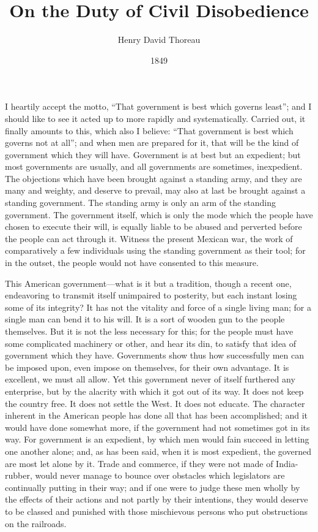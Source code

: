 \documentclass[letterpaper,12pt]{article}
\title{On the Duty of Civil Disobedience}
\author{Henry David Thoreau}
\date{1849}
\begin{document}
\maketitle

I heartily accept the motto, \enquote{That government is best which governs
    least}; and I should like to see it acted up to more rapidly and
systematically. Carried out, it finally amounts to this, which also I believe:
\enquote{That government is best which governs not at all}; and when men are
prepared for it, that will be the kind of government which they will have.
Government is at best but an expedient; but most governments are usually, and
all governments are sometimes, inexpedient. The objections which have been
brought against a standing army, and they are many and weighty, and deserve to
prevail, may also at last be brought against a standing government. The standing
army is only an arm of the standing government. The government itself, which is
only the mode which the people have chosen to execute their will, is equally
liable to be abused and perverted before the people can act through it. Witness
the present Mexican war, the work of comparatively a few individuals using the
standing government as their tool; for in the outset, the people would not have
consented to this measure.

This American government---what is it but a tradition, though a recent one,
endeavoring to transmit itself unimpaired to posterity, but each instant losing
some of its integrity? It has not the vitality and force of a single living man;
for a single man can bend it to his will. It is a sort of wooden gun to the
people themselves. But it is not the less necessary for this; for the people
must have some complicated machinery or other, and hear its din, to satisfy that
idea of government which they have. Governments show thus how successfully men
can be imposed upon, even impose on themselves, for their own advantage. It is
excellent, we must all allow.  Yet this government never of itself furthered any
enterprise, but by the alacrity with which it got out of its way. It does not
keep the country free. It does not settle the West. It does not educate. The
character inherent in the American people has done all that has been
accomplished; and it would have done somewhat more, if the government had not
sometimes got in its way.  For government is an expedient, by which men would
fain succeed in letting one another alone; and, as has been said, when it is
most expedient, the governed are most let alone by it. Trade and commerce, if
they were not made of India-rubber, would never manage to bounce over obstacles
which legislators are continually putting in their way; and if one were to judge
these men wholly by the effects of their actions and not partly by their
intentions, they would deserve to be classed and punished with those mischievous
persons who put obstructions on the railroads.
\end{document}
